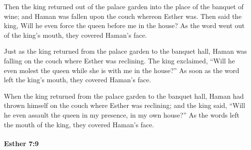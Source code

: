 			\begin{versebox}
					\item[BHS] 
					\item[LXX] 
					\item[ASV] Then the king returned out of the palace garden into the place of the banquet of wine; and Haman was fallen upon the couch whereon Esther was. Then said the king, Will he even force the queen before me in the house? As the word went out of the king's mouth, they covered Haman's face.
					\item[NIV] Just as the king returned from the palace garden to the banquet hall, Haman was falling on the couch where Esther was reclining. The king exclaimed, “Will he even molest the queen while she is with me in the house?” As soon as the word left the king’s mouth, they covered Haman’s face.
					\item[NRSV] When the king returned from the palace garden to the banquet hall, Haman had thrown himself on the couch where Esther was reclining; and the king said, “Will he even assault the queen in my presence, in my own house?” As the words left the mouth of the king, they covered Haman’s face.
			\end{versebox}

		\paragraph{Esther 7:9} %
			\label{ESTHER-7-9}

